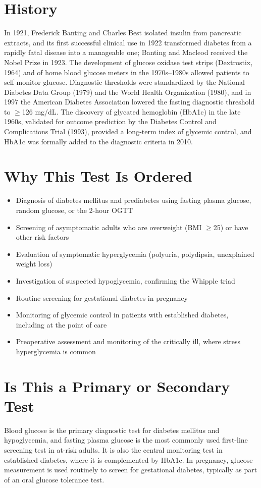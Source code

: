 \section*{History}
In 1921, Frederick Banting and Charles Best isolated insulin from pancreatic extracts, and its first successful clinical use in 1922 transformed diabetes from a rapidly fatal disease into a manageable one; Banting and Macleod received the Nobel Prize in 1923. The development of glucose oxidase test strips (Dextrostix, 1964) and of home blood glucose meters in the 1970s--1980s allowed patients to self-monitor glucose. Diagnostic thresholds were standardized by the National Diabetes Data Group (1979) and the World Health Organization (1980), and in 1997 the American Diabetes Association lowered the fasting diagnostic threshold to $\geq$126 mg/dL. The discovery of glycated hemoglobin (HbA1c) in the late 1960s, validated for outcome prediction by the Diabetes Control and Complications Trial (1993), provided a long-term index of glycemic control, and HbA1c was formally added to the diagnostic criteria in 2010.
\section*{Why This Test Is Ordered}
\begin{itemize}
  \item Diagnosis of diabetes mellitus and prediabetes using fasting plasma glucose, random glucose, or the 2-hour OGTT
  \item Screening of asymptomatic adults who are overweight (BMI $\geq$25) or have other risk factors
  \item Evaluation of symptomatic hyperglycemia (polyuria, polydipsia, unexplained weight loss)
  \item Investigation of suspected hypoglycemia, confirming the Whipple triad
  \item Routine screening for gestational diabetes in pregnancy
  \item Monitoring of glycemic control in patients with established diabetes, including at the point of care
  \item Preoperative assessment and monitoring of the critically ill, where stress hyperglycemia is common
\end{itemize}
\section*{Is This a Primary or Secondary Test}
Blood glucose is the primary diagnostic test for diabetes mellitus and hypoglycemia, and fasting plasma glucose is the most commonly used first-line screening test in at-risk adults. It is also the central monitoring test in established diabetes, where it is complemented by HbA1c. In pregnancy, glucose measurement is used routinely to screen for gestational diabetes, typically as part of an oral glucose tolerance test.
